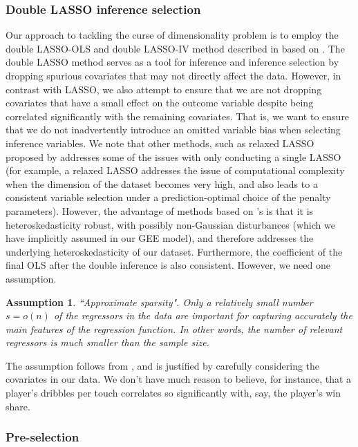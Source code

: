 \documentclass[12pt]{article}
\newtheorem{assumption}{Assumption}
\begin{document}
	\subsubsection{Double LASSO inference selection}
	
	Our approach to tackling the curse of dimensionality problem is to employ the double LASSO-OLS and double LASSO-IV method described in \cite{urminsky_using_2016} based on \cite{belloni_high-dimensional_2014}. The double LASSO method serves as a tool for inference and inference selection by dropping spurious covariates that may not directly affect the data. However, in contrast with LASSO, we also attempt to ensure that we are not dropping covariates that have a small effect on the outcome variable despite being correlated significantly with the remaining covariates. That is, we want to ensure that we do not inadvertently introduce an omitted variable bias when selecting inference variables. We note that other methods, such as relaxed LASSO proposed by \cite{meinshausen_relaxed_2007} addresses some of the issues with only conducting a single LASSO (for example, a relaxed LASSO addresses the issue of computational complexity when the dimension of the dataset becomes very high, and also leads to a consistent variable selection under a prediction-optimal choice of the penalty parameters). However, the advantage of methods based on \cite{belloni_high-dimensional_2014}'s is that it is heteroskedasticity robust, with possibly non-Gaussian disturbances (which we have implicitly assumed in our GEE model), and therefore addresses the underlying heteroskedasticity of our dataset. Furthermore, the coefficient of the final OLS after the double inference is also consistent. However, we need one assumption.
	
	\begin{assumption}{``Approximate sparsity".}
		Only a relatively small number $s = o\left(n\right)$ of the regressors in the data are important for capturing accurately the main features of the regression function. In other words, the number of relevant regressors is much smaller than the sample size.
	\end{assumption}
	
	The assumption follows from \cite{belloni_high-dimensional_2014}, and is justified by carefully considering the covariates in our data. We don't have much reason to believe, for instance, that a player's dribbles per touch correlates so significantly with, say, the player's win share.
	
	\subsubsection{Pre-selection}
	
\end{document}
